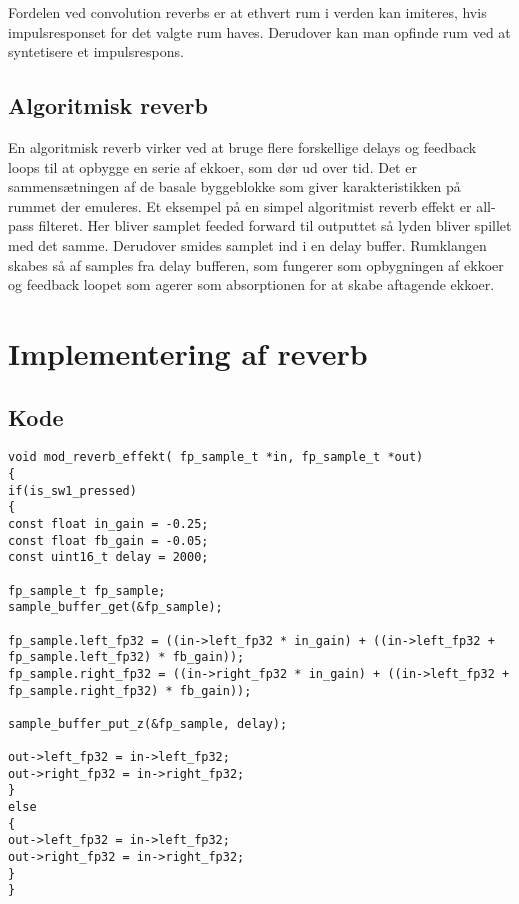 Fordelen ved convolution reverbs er at ethvert rum i verden kan imiteres, hvis impulsresponset for det valgte rum haves.\newline
Derudover kan man opfinde rum ved at syntetisere et impulsrespons.

\subsection{Algoritmisk reverb}
En algoritmisk reverb virker ved at bruge flere forskellige delays og feedback loops til at opbygge en serie af ekkoer, som dør ud over tid.
Det er sammensætningen af de basale byggeblokke som giver karakteristikken på rummet der emuleres.\newline
Et eksempel på en simpel algoritmist reverb effekt er all-pass filteret.
Her bliver samplet feeded forward til outputtet så lyden bliver spillet med det samme.
Derudover smides samplet ind i en delay buffer.
Rumklangen skabes så af samples fra delay bufferen, som fungerer som opbygningen af ekkoer og feedback loopet som agerer som absorptionen for at skabe aftagende ekkoer.




\section{Implementering af reverb}
\subsection{Kode}
\begin{lstlisting}
void mod_reverb_effekt( fp_sample_t *in, fp_sample_t *out)
{
if(is_sw1_pressed)
{
const float in_gain = -0.25;
const float fb_gain = -0.05;
const uint16_t delay = 2000;

fp_sample_t fp_sample;
sample_buffer_get(&fp_sample);

fp_sample.left_fp32 = ((in->left_fp32 * in_gain) + ((in->left_fp32 + fp_sample.left_fp32) * fb_gain));
fp_sample.right_fp32 = ((in->right_fp32 * in_gain) + ((in->left_fp32 + fp_sample.right_fp32) * fb_gain));

sample_buffer_put_z(&fp_sample, delay);

out->left_fp32 = in->left_fp32;
out->right_fp32 = in->right_fp32;
}
else
{
out->left_fp32 = in->left_fp32;
out->right_fp32 = in->right_fp32;
}
}
\end{lstlisting}

